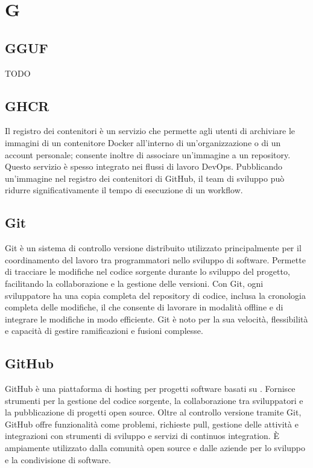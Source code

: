 \section{G}

\vspace{2em}
\subsection*{GGUF}
TODO

\vspace{2em}
\subsection*{GHCR}
Il registro dei contenitori è un servizio che permette agli utenti di archiviare le immagini di un contenitore Docker all'interno di un'organizzazione o di un account personale; consente inoltre di associare un'immagine a un repository. Questo servizio è spesso integrato nei flussi di lavoro DevOps. Pubblicando un'immagine nel registro dei contenitori di GitHub, il team di sviluppo può ridurre significativamente il tempo di esecuzione di un workflow.

\vspace{2em}
\subsection*{Git}
Git è un sistema di controllo versione distribuito utilizzato principalmente per il coordinamento del lavoro tra programmatori nello sviluppo di software. Permette di tracciare le modifiche nel codice sorgente durante lo sviluppo del progetto, facilitando la collaborazione e la gestione delle versioni. Con Git, ogni sviluppatore ha una copia completa del repository di codice, inclusa la cronologia completa delle modifiche, il che consente di lavorare in modalità offline e di integrare le modifiche in modo efficiente. Git è noto per la sua velocità, flessibilità e capacità di gestire ramificazioni e fusioni complesse.

\vspace{2em}
\subsection*{GitHub}
GitHub è una piattaforma di hosting per progetti software basati su . Fornisce strumenti per la gestione del codice sorgente, la collaborazione tra sviluppatori e la pubblicazione di progetti open source. Oltre al controllo versione tramite Git, GitHub offre funzionalità come problemi, richieste pull, gestione delle attività e integrazioni con strumenti di sviluppo e servizi di continuos integration. È ampiamente utilizzato dalla comunità open source e dalle aziende per lo sviluppo e la condivisione di software.

